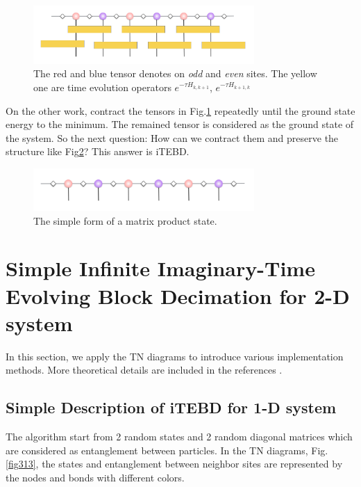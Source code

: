 \begin{figure}[ht]
	\centering
	\includegraphics[width=0.75\textwidth]{figures/fig312.png}
	\caption[The picture of the main idea of itebd.]{The red and blue tensor denotes on \textit{odd} and \textit{even} sites. The yellow one are time evolution operators $e^{-\tau H_{k,k+1}}$, $e^{-\tau H_{k+1,k}}$}
	\label{fig312}
\end{figure}

On the other work, contract the tensors in Fig.\ref{fig312} repeatedly until the ground state energy to the minimum. The remained tensor is considered as the ground state of the system. So the next question: How can we contract them and preserve the structure like Fig{\ref{fig311}}? This answer is iTEBD.

\begin{figure}[ht]
	\centering
	\includegraphics[width=0.75\textwidth]{figures/fig311.png}
	\caption[The picture of matrix product states]{The simple form of a matrix product state.}
	\label{fig311}
\end{figure}

\section{Simple Infinite Imaginary-Time Evolving Block Decimation for 2-D system}
In this section, we apply the TN diagrams to introduce various implementation methods. More theoretical details are included in the references \cite{vidal_classical_2007} \cite{jiang_accurate_2008} \cite{orus_infinite_2008}.

\label{itebd}
\subsection{Simple Description of iTEBD for 1-D system}

The algorithm start from 2 random states and 2 random diagonal matrices which are considered as entanglement between particles. In the TN diagrams, Fig.\ref{fig313}, the states and entanglement between neighbor sites are represented by the nodes and bonds with different colors.

